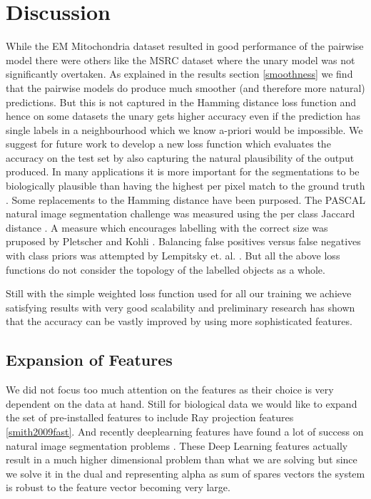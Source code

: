 \chapter{Discussion}
While the EM Mitochondria dataset resulted in good performance of the pairwise model there were others like the MSRC dataset where the unary model was not significantly overtaken. As explained in the results section \ref{smoothness} we find that the pairwise models do produce much smoother (and therefore more natural) predictions. But this is not captured in the Hamming distance loss function and hence on some datasets the unary gets higher accuracy even if the prediction has single labels in a neighbourhood which we know a-priori would be impossible. We suggest for future work to develop a new loss function which evaluates the accuracy on the test set by also capturing the natural plausibility of the output produced. In many applications it is more important for the segmentations to be biologically plausible than having the highest per pixel match to the ground truth . Some replacements to the Hamming distance have been purposed. The PASCAL natural image segmentation challenge was measured using the per class Jaccard distance \cite{everingham2010pascal}. A measure which encourages labelling with the correct size was pruposed by Pletscher and Kohli \cite{pletscher2012learning}. Balancing false positives versus false negatives with class priors was attempted by Lempitsky et. al. \cite{lempitsky2011pylon}. But all the above loss functions do not consider the topology of the labelled objects as a whole.
\par
Still with the simple weighted loss function used for all our training we achieve satisfying results with very good scalability and preliminary research has shown that the accuracy can be vastly improved by using more sophisticated features. 


\section{Expansion of Features}
We did not focus too much attention on the features as their choice is very dependent on the data at hand. Still for biological data we would like to expand the set of pre-installed features to include Ray projection features \ref{smith2009fast}. And recently deeplearning features have found a lot of success on natural image segmentation problems \cite{krizhevsky2012imagenet}. These Deep Learning features actually result in a much higher dimensional problem than what we are solving but since we solve it in the dual and representing alpha as sum of spares vectors the system is robust to the feature vector becoming very large. 
